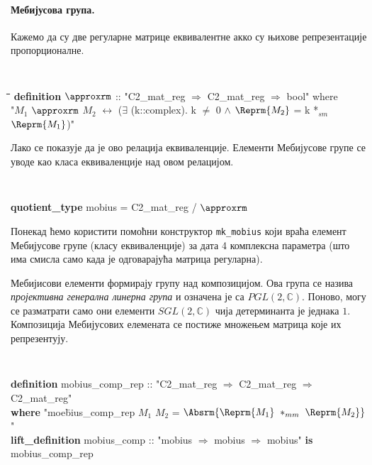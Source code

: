 \paragraph{Мебијусова група.}
Кажемо да су две регуларне матрице еквивалентне акко су њихове
репрезентације пропорционалне.  {\tt
  \begin{tabbing}
    \hspace{5mm}\=\hspace{5mm}\=\hspace{5mm}\=\hspace{5mm}\=\hspace{5mm}\=\kill
{\bf definition} $\approxrm$ :: "C2\_mat\_reg $\Rightarrow$ C2\_mat\_reg $\Rightarrow$ bool" where  \\
\> "$M_1$ $\approxrm$ $M_2$ $\longleftrightarrow$ ($\exists$ (k::complex). k $\neq$ 0 $\wedge$ $\Reprm{M_2}$ = k *$_{sm}$ $\Reprm{M_1}$)"
  \end{tabbing}
}

\noindent Лако се показује да је ово релација еквиваленције. Елементи
Мебијусове групе се уводе као класа еквиваленције над овом релацијом.

{\tt
\begin{tabbing}
{\bf quotient\_type} mobius = C2\_mat\_reg / $\approxrm$
\end{tabbing}
}

\noindent Понекад ћемо користити помоћни конструктор {\tt mk\_mobius}
који враћа елемент Мебијусове групе (класу еквиваленције) за дата 4
комплексна параметра (што има смисла само када је одговарајућа матрица
регуларна).

Мебијисови елементи формирају групу над композицијом. Ова група се
назива \emph{пројективна генерална линерна група} и означена је са
$PGL(2, \mathbb{C})$. Поново, могу се разматрати само они елементи
$SGL(2, \mathbb{C})$ чија детерминанта је једнака $1$. Композиција
Мебијусових елемената се постиже множењем матрица које их
репрезентују.

{\tt
\begin{tabbing}
{\bf def}\={\bf inition} mobius\_comp\_rep :: "C2\_mat\_reg $\Rightarrow$ C2\_mat\_reg $\Rightarrow$ C2\_mat\_reg" \\
\> {\bf where} "moe\=bius\_comp\_rep $M_1$ $M_2$ = $\Absrm{\Reprm{M_1}\ *_{mm}\ \Reprm{M_2}}$"\\
{\bf lift\_definition} mobius\_comp :: "mobius $\Rightarrow$ mobius $\Rightarrow$ mobius" {\bf is}\\
\>mobius\_comp\_rep
\end{tabbing}
}

